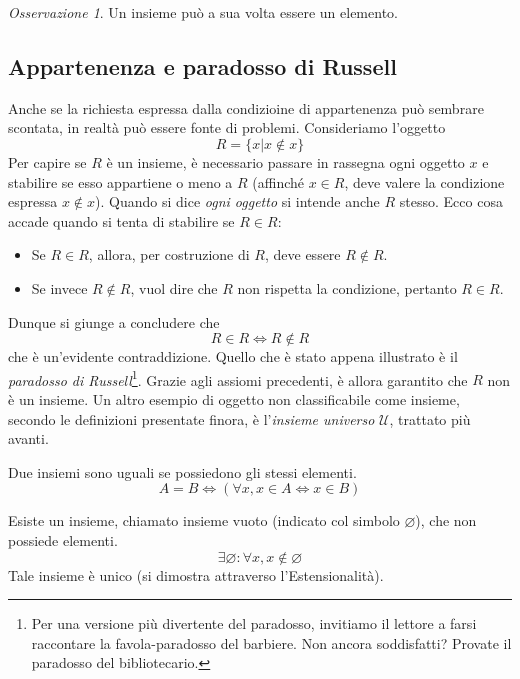 \documentclass[oneside]{book}
\theoremstyle{remark}
\newtheorem*{osservaz}{Osservazione}
\begin{document}
\begin{osservaz}
Un insieme può a sua volta essere un elemento.
\end{osservaz}

\subsection*{Appartenenza e paradosso di Russell}
Anche se la richiesta espressa dalla condizioine di appartenenza può sembrare
scontata, in realtà può essere fonte di problemi. Consideriamo l'oggetto
\[ R = \{x|x\not\in x\} \]
Per capire se $R$ è un insieme, è necessario passare in rassegna ogni oggetto
$x$ e stabilire se esso appartiene o meno a $R$ (affinché $x\in R$, deve valere
la condizione espressa $x\not\in x$). Quando si dice \textit{ogni oggetto} si
intende anche $R$ stesso. Ecco cosa accade quando si tenta di stabilire se
$R\in R$:
\begin{itemize}
\item Se $R\in R$, allora, per costruzione di $R$, deve essere $R\not\in R$.
\item Se invece $R\not\in R$, vuol dire che $R$ non rispetta la condizione, pertanto $R\in R$.
\end{itemize}
Dunque si giunge a concludere che \[ R\in R \Longleftrightarrow R\not\in R \]
che è un'evidente contraddizione. Quello che è stato appena illustrato è il \textit{paradosso
di Russell}\footnote{Per una versione più divertente del paradosso, invitiamo il
lettore a farsi raccontare la favola-paradosso del barbiere. Non ancora soddisfatti? Provate il paradosso del bibliotecario.}. Grazie agli assiomi precedenti, è allora garantito che $R$ non è
un insieme. Un altro esempio di oggetto non classificabile come insieme,
secondo le definizioni presentate finora, è l'\textit{insieme universo} $\mathcal{U}$,
trattato più avanti.

\begin{tcolorbox}[colback=yellow!30, colframe=yellow!30!black, title={Assioma di Estensionalità}]
Due insiemi sono uguali se possiedono gli stessi elementi.
\[ A = B \Longleftrightarrow (\forall x,x\in A \Leftrightarrow x \in B) \]
\end{tcolorbox}

\begin{tcolorbox}[colback=yellow!30, colframe=yellow!30!black, title=Esistenza dell'insieme vuoto]
Esiste un insieme, chiamato insieme vuoto (indicato col simbolo $\varnothing$), che non possiede elementi.
\[\exists \varnothing:\forall x, x\not\in\varnothing\]
Tale insieme è unico (si dimostra attraverso l'Estensionalità).
\end{tcolorbox}
\end{document}
